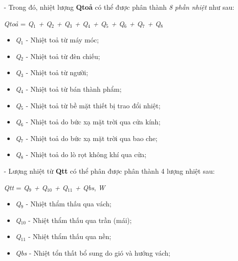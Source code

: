 - Trong đó, nhiệt lượng \textbf{Q{\footnotesize toả}} có thể được phân thành \textit{8 phần nhiệt} như sau:

\begin{center}
	\textit{Q{\footnotesize toả}} = \textit{Q$ _{1} $ + Q$ _{2} $ + Q$ _{3} $ + Q$ _{4} $ + Q$ _{5} $ + Q$ _{6} $ + Q$ _{7} $ + Q$ _{8} $}
\end{center}

\begin{itemize}[leftmargin = 3cm, label = $\ast$]
	\item \textit{Q$ _{1} $} - Nhiệt toả từ máy móc;
	
	\item \textit{Q$ _{2} $} - Nhiệt toả từ đèn chiếu;
	
	\item \textit{Q$ _{3} $} - Nhiệt toả từ người;
	
	\item \textit{Q$ _{4} $} - Nhiệt toả từ bán thành phẩm;
	
	\item \textit{Q$ _{5} $} - Nhiệt toả từ bề mặt thiết bị trao đổi nhiệt;
	
	\item \textit{Q$ _{6} $} - Nhiệt toả do bức xạ mặt trời qua cửa kính;
	
	\item \textit{Q$ _{7} $} - Nhiệt toả do bức xạ mặt trời qua bao che;
	
	\item \textit{Q$ _{8} $} - Nhiệt toả do lò rọt không khí qua cửa;
\end{itemize}

- Lượng nhiệt từ \textbf{Q{\footnotesize tt}} có thể phân được phân thành 4 lượng nhiệt sau:

\begin{center}
	\textit{Q{\footnotesize tt}} = \textit{Q$ _{9} $ + Q$ _{10} $ + Q$ _{11} $ + Q{\footnotesize bs}}, \textit{W}
\end{center}

\begin{itemize}[leftmargin = 3cm, label = $\ast$]
	\item \textit{Q$ _{9} $} - Nhiệt thẩm thấu qua vách;
	
	\item \textit{Q$ _{10} $} - Nhiệt thẩm thấu qua trần (mái);
	
	\item \textit{Q$ _{11} $} - Nhiệt thẩm thấu qua nền;
	
	\item \textit{Q{\footnotesize bs}} - Nhiệt tổn thất bổ sung do gió và hướng vách;
\end{itemize}


